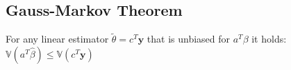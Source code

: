 
\subsection*{Gauss-Markov Theorem}
For any linear estimator $\widetilde{\theta}=c^T\mathbf{y}$ that is unbiased for $a^T\beta$ it holds: $\mathbb{V}(a^T\hat{\beta}) \leq \mathbb{V}(c^T\mathbf{y})$\\







